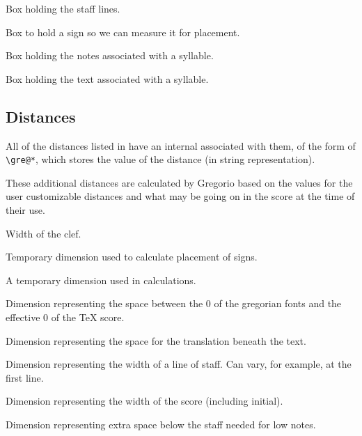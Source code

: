 Box holding the staff lines.

Box to hold a sign so we can measure it for placement.

Box holding the notes associated with a syllable.

Box holding the text associated with a syllable.



\subsection{Distances}
All of the distances listed in  have an internal
associated with them, of the form of \verb=\gre@*=, which stores the value of the distance (in
string representation).

These additional distances are calculated by Gregorio based on the values for the user customizable distances and what may be going on in the score at the time of their use.

Width of the clef.

Temporary dimension used to calculate placement of signs.

A temporary dimension used in calculations.

Dimension representing the space between the 0 of the gregorian fonts and the effective 0 of the TeX score.

Dimension representing the space for the translation beneath the text.

Dimension representing the width of a line of staff.  Can vary, for
example, at the first line.

Dimension representing the width of the score (including initial).

Dimension representing extra space below the staff needed for low notes.

